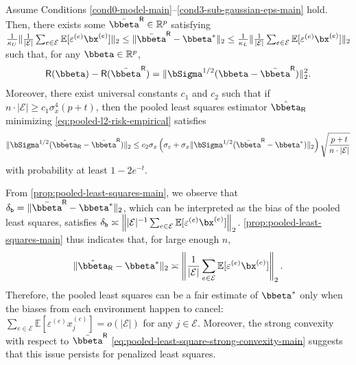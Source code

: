 \documentclass[10pt]{article}
\numberwithin{equation}{section}
\begin{document}
{\begin{proposition}
\label{prop:pooled-least-squares-main}
 Assume Conditions \ref{cond0-model-main}--\ref{cond3-sub-gaussian-eps-main} hold. Then, there exists some $\bar{\bbeta}^{\mathsf{R}} \in \mathbb{R}^p$ satisfying $\frac{1}{\kappa_U} \|\frac{1}{|\mathcal{E}|}\sum_{e\in \mathcal{E}} \mathbb{E} [\varepsilon^{(e)} \bx^{(e)}] \|_2 \le \|\bar{\bbeta}^{\mathsf{R}} - \bbeta^*\|_2 \le \frac{1}{\kappa_L} \|\frac{1}{|\mathcal{E}|}\sum_{e\in \mathcal{E}} \mathbb{E} [\varepsilon^{(e)} \bx^{(e)}] \|_2$ 
    such that, for any $\bbeta \in \mathbb{R}^p$,
    \begin{align}
    \label{eq:pooled-least-square-strong-convexity-main}
        \mathsf{R}(\bbeta) - \mathsf{R}(\bar{\bbeta}^{\mathsf{R}}) = \|\bSigma^{1/2}(\bbeta - \bar{\bbeta}^{\mathsf{R}})\|_2^2.
    \end{align} Moreover, there exist universal constants $c_1$ and $c_2$ such that if $n\cdot |\mathcal{E}| \ge c_1 \sigma_x^4(p + t)$, then the pooled least      squares estimator $\hat{\bbeta}_{\mathsf{R}}$ minimizing \eqref{eq:pooled-l2-risk-empirical} satisfies
    \begin{align*}
        \|{\bSigma}^{1/2}(\hat{\bbeta}_{\mathsf{R}} - \bar{\bbeta}^{\mathsf{R}})\|_2 \le c_2 \sigma_x \left(\sigma_\varepsilon + \sigma_x \|{\bSigma}^{1/2}(\bar{\bbeta}^{\mathsf{R}} - \bbeta^*)\|_2\right) \sqrt{\frac{p + t}{{ n\cdot |\mathcal{E}|}}}
    \end{align*} with probability at least $1-2e^{-t}$.
\end{proposition}

From \cref{prop:pooled-least-squares-main}, we observe that $\delta_{\mathtt{b}}=\|\bar{\bbeta}^{\mathsf{R}} - \bbeta^*\|_2$, which can be interpreted as the bias of the pooled least squares, satisfies $\delta_{\mathtt{b}} \asymp \left\||\mathcal{E}|^{-1} \sum_{e\in \mathcal{E}}  \mathbb{E} [\varepsilon^{(e)} \bx^{(e)}] \right\|_2$. \cref{prop:pooled-least-squares-main} thus indicates that, for large enough $n$,
\begin{align*}
    \|\hat{\bbeta}_{\mathsf{R}} - \bbeta^*\|_2 \asymp \left\|\frac{1}{|\mathcal{E}|}\sum_{e\in \mathcal{E}} \mathbb{E}[\varepsilon^{(e)} \bx^{(e)}]\right\|_2.
\end{align*} 
Therefore, the pooled least squares can be a fair estimate of $\bbeta^*$ only when the biases from each environment happen to cancel: $\sum_{e\in \mathcal{E}} \mathbb{E} [\varepsilon^{(e)} x_j^{(e)}] = o(|\mathcal{E}|)$ for any $j\in \mathcal{E}$. Moreover, the strong convexity with respect to $\bar{\bbeta}^{\mathsf{R}}$ \eqref{eq:pooled-least-square-strong-convexity-main} suggests that this issue persists for penalized least squares.



}
\end{document}
